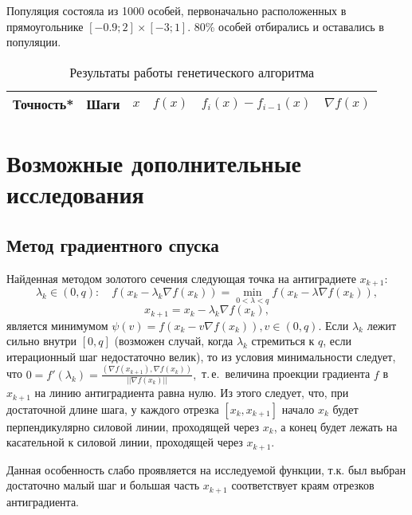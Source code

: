 \documentclass[10pt,a4paper,titlepage]{article}
\begin{document}
Популяция состояла из 1000 особей, первоначально расположенных в прямоугольнике $[-0.9; 2] \times [-3; 1].$
80\% особей отбирались и оставались в популяции.

\begin{table}[H]
\caption{Результаты работы генетического алгоритма}
\label{gen-result-table}
\begin{center}
\begin{tabular}{|c|c|c|c|c|c|}
\hline
Точность* & Шаги & $x$ & $f(x)$ & $f_i(x) - f_{i - 1}(x)$ & $\nabla f(x)$ \\
\hline

\hline
\end{tabular}
\end{center}
\end{table}

\section{Возможные дополнительные исследования}
\subsection{Метод градиентного спуска}
Найденная методом золотого сечения следующая точка на антиградиете $x_{k+1}$:
$$
  \lambda_k \in (0, q)\!:
    \quad f(x_k - \lambda_k \nabla f(x_k)) = \min\limits_{0 < \lambda < q} f(x_k - \lambda \nabla f(x_k)),
$$
$$
  x_{k+1} = x_k - \lambda_k \nabla f(x_k),
$$
является минимумом $\psi(v) = f(x_k - v \nabla f(x_k)), v \in (0, q).$
Если $\lambda_k$ лежит сильно внутри $[0, q]$ 
(возможен случай, когда $\lambda_k$ стремиться к $q$, если итерационный шаг недостаточно велик), 
то из условия минимальности следует, что 
$0 = f'(\lambda_k) = \frac{\left( \nabla f(x_{k+1}), \nabla f(x_{k}) \right) }{|| \nabla f(x_{k}) ||},$
т.\,е.~величина проекции градиента $f$ в $x_{k+1}$ на линию антиградиента равна нулю. 
Из этого следует, что, при достаточной длине шага, 
у каждого отрезка $[x_k, x_{k+1}]$ 
начало $x_k$ будет перпендикулярно силовой линии, проходящей через $x_k$, 
а конец будет лежать на касательной к силовой линии, проходящей через $x_{k+1}$.

Данная особенность слабо проявляется на исследуемой функции, т.к. был выбран достаточно малый шаг и большая часть 
$x_{k+1}$ соответствует краям отрезков антиградиента.

\end{document}
